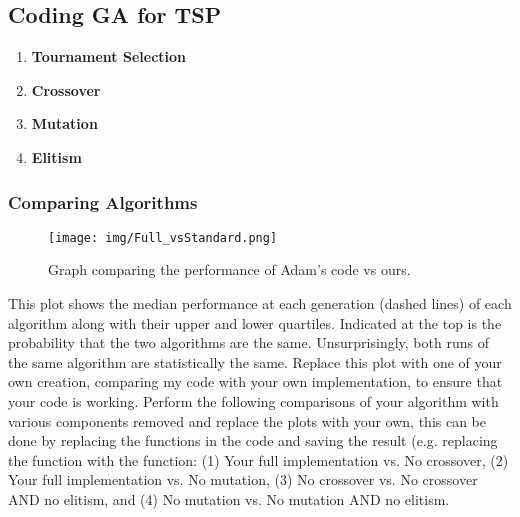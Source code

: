 \documentclass{article}
\begin{document}
\subsection{Coding GA for TSP}
\begin{enumerate}

\item \textbf{Tournament Selection}
	
	
\newpage

\item \textbf{Crossover}
	
	
\item \textbf{Mutation}
	
	
\item \textbf{Elitism}
		
	
\end{enumerate}

\subsubsection{Comparing Algorithms}
\newpage

	

	\begin{figure}[http]
	\begin{center}
	\texttt{[image: img/Full\_vsStandard.png]}
	\caption{Graph comparing the performance of Adam's code vs ours.}
	\end{center}
	\end{figure}
	
	This plot shows the median performance at each generation (dashed lines) of each algorithm along with their upper and lower quartiles. Indicated at the top is the probability that the two algorithms are the same. Unsurprisingly, both runs of the same algorithm are statistically the same. Replace this plot with one of your own creation, comparing my code with your own implementation, to ensure that your code is working.
\newpage
	Perform the following comparisons of your algorithm with various components removed and replace the plots with your own, this can be done by replacing the functions in the code and saving the result (e.g. replacing the  function with the  function: (1) Your full implementation vs. No crossover, (2) Your full implementation vs. No mutation, (3) No crossover vs. No crossover AND no elitism, and (4) No mutation  vs. No mutation AND no elitism.
\end{document}
